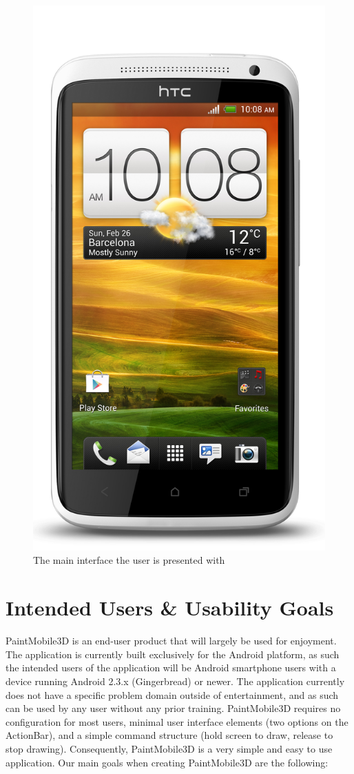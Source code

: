 \documentclass{chi-ext}
\begin{document}
\begin{figure} %
\parbox{1\columnwidth}{

\centering \includegraphics[width=0.8\columnwidth]{onex.jpg} \caption{The main
interface the user is presented with} \label{fig:maininterface} } \end{figure}

\pagebreak

\section{Intended Users \& Usability Goals}

PaintMobile3D is an end-user product that will largely be used for enjoyment.
The application is currently built exclusively for the Android platform, as
such the intended users of the application will be Android smartphone users
with a device running Android 2.3.x (Gingerbread) or newer. The application
currently does not have a specific problem domain outside of entertainment,
and as such can be used by any user without any prior training. PaintMobile3D
requires no configuration for most users, minimal user interface elements (two
options on the ActionBar), and a simple command structure (hold screen to
draw, release to stop drawing). Consequently, PaintMobile3D is a very simple
and easy to use application. Our main goals when creating PaintMobile3D are
the following:
\end{document}

